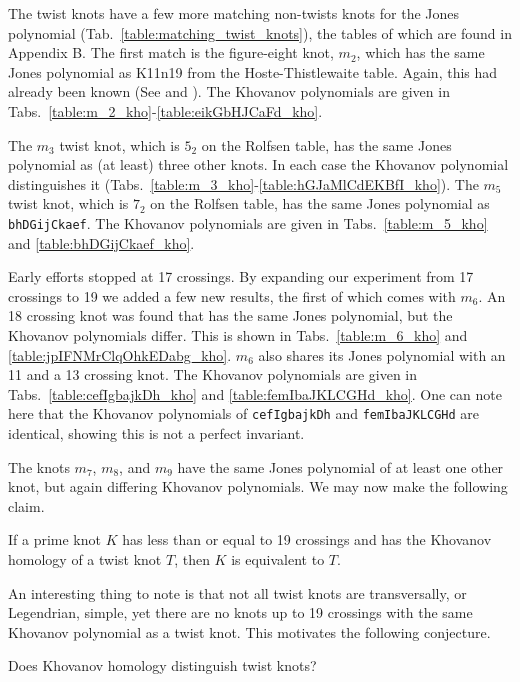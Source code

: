     The twist knots have a few more matching non-twists knots for the
    Jones polynomial (Tab.~\ref{table:matching_twist_knots}), the tables of
    which are found in Appendix B. The first match is the
    figure-eight knot, $m_{2}$, which has the same Jones polynomial as
    K11n19 from the Hoste-Thistlewaite table.
    Again, this had already been known
    (See \cite{KatlasFigureEight} and \cite{KatlasK11n19}).
    The Khovanov polynomials are
    given in Tabs.~\ref{table:m_2_kho}-\ref{table:eikGbHJCaFd_kho}.
    \par\hfill\par
    The $m_{3}$ twist knot, which is $5_{2}$ on the Rolfsen table,
    has the same Jones polynomial as (at least) three other knots. In each
    case the Khovanov polynomial distinguishes it
    (Tabs.~\ref{table:m_3_kho}-\ref{table:hGJaMlCdEKBfI_kho}).
    The $m_{5}$ twist knot, which is $7_{2}$ on the Rolfsen table, has the
    same Jones polynomial as \texttt{bhDGijCkaef}. The Khovanov polynomials
    are given in Tabs.~\ref{table:m_5_kho} and \ref{table:bhDGijCkaef_kho}.
    \par\hfill\par
    Early efforts stopped at 17 crossings. By
    expanding our experiment from 17 crossings to 19 we added a few new
    results, the first of which comes with
    $m_{6}$. An 18 crossing knot was found
    that has the same Jones polynomial, but the Khovanov polynomials
    differ. This is shown in
    Tabs.~\ref{table:m_6_kho} and \ref{table:jpIFNMrClqOhkEDabg_kho}.
    $m_{6}$ also shares its Jones polynomial with an 11 and a 13 crossing
    knot. The Khovanov polynomials are given in
    Tabs.~\ref{table:cefIgbajkDh_kho} and
    \ref{table:femIbaJKLCGHd_kho}.
    One can note here that the Khovanov polynomials of \texttt{cefIgbajkDh} and
    \texttt{femIbaJKLCGHd} are identical, showing this is not a perfect
    invariant.
    \par\hfill\par
    The knots $m_{7}$, $m_{8}$, and $m_{9}$ have the same Jones polynomial
    of at least one other knot, but again differing Khovanov polynomials.
    We may now make the following claim.
    \begin{theorem}
        If a prime knot $K$ has less than or equal to 19 crossings and has
        the Khovanov homology of a twist knot $T$,
        then $K$ is equivalent to $T$.
    \end{theorem}
    An interesting thing to note is that not all twist knots are
    transversally, or Legendrian, simple, yet there are no knots up to
    19 crossings with the same Khovanov polynomial as a twist knot. This
    motivates the following conjecture.
    \begin{question}
        Does Khovanov homology distinguish twist knots?
    \end{question}
